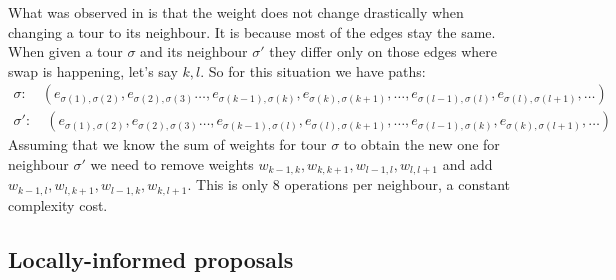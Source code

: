 		What was observed in \cite{decryption_tsp_MCMC} is that the weight does not change drastically when changing a tour to its neighbour. It is because most of the edges stay the same. When given a tour $\sigma$ and its neighbour $\sigma'$ they differ only on those edges where swap is happening, let's say $k,l$. So for this situation we have paths:
		\begin{align*}
			\sigma: \quad (e_{\sigma(1), \sigma(2)}, e_{\sigma(2), \sigma(3)} \ldots, e_{\sigma(k-1), \sigma(k)}, e_{\sigma(k), \sigma(k+1)}, \ldots, e_{\sigma(l-1), \sigma(l)}, e_{\sigma(l), \sigma(l+1)}, \ldots) \\
			\sigma': \quad(e_{\sigma(1), \sigma(2)}, e_{\sigma(2), \sigma(3)} \ldots, e_{\sigma(k-1), \sigma(l)}, e_{\sigma(l), \sigma(k+1)}, \ldots, e_{\sigma(l-1), \sigma(k)}, e_{\sigma(k), \sigma(l+1)}, \ldots)
		\end{align*}
		Assuming that we know the sum of weights for tour $\sigma$ to obtain the new one for neighbour $\sigma'$ we need to remove weights $w_{k-1, k}, w_{k, k+1}, w_{l-1, l}, w_{l, l+1}$ and add $w_{k-1, l}, w_{l, k+1}, w_{l-1, k}, w_{k, l+1}$. This is only $8$ operations per neighbour, a constant complexity cost.

\subsection{Locally-informed proposals}